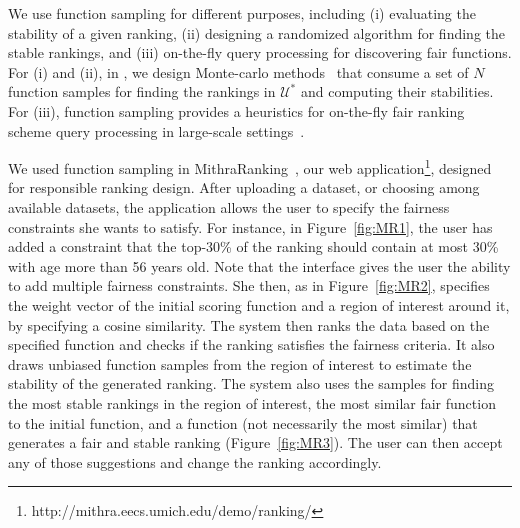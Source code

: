 We use function sampling for different purposes, including (i) evaluating the stability of a given ranking, (ii) designing a randomized algorithm for finding the stable rankings, and (iii) on-the-fly query processing for discovering fair functions.
For (i) and (ii), in \cite{asudeh2018obtaining}, we design  Monte-carlo methods~\cite{montecarlo} that consume a set of $N$ function samples for finding the rankings in $\mathcal{U}^*$ and computing their stabilities.
For (iii), function sampling provides a heuristics for on-the-fly fair ranking scheme query processing in large-scale settings~\cite{asudeh2019designing}.

We used function sampling in MithraRanking~\cite{guan2019mithraranking}, our web application\footnote{http://mithra.eecs.umich.edu/demo/ranking/}, designed for responsible ranking design.
After uploading a dataset, or choosing among available datasets, the application allows the user to specify the fairness constraints she wants to satisfy.
For instance, in Figure~\ref{fig:MR1}, the user has added a constraint that the top-30\% of the ranking should contain at most 30\% with age more than 56 years old. Note that the interface gives the user the ability to add multiple fairness constraints.
She then, as in Figure~\ref{fig:MR2}, specifies the weight vector of the initial scoring function and a region of interest around it, by specifying a cosine similarity.
The system then ranks the data based on the specified function and checks if the ranking satisfies the fairness criteria. It also draws unbiased function samples from the region of interest to estimate the stability of the generated ranking. The system also uses the samples for finding the most stable rankings in the region of interest, the most similar fair function to the initial function, and a function (not necessarily the most similar) that generates a fair and stable ranking (Figure~\ref{fig:MR3}).
The user can then accept any of those suggestions and change the ranking accordingly.

